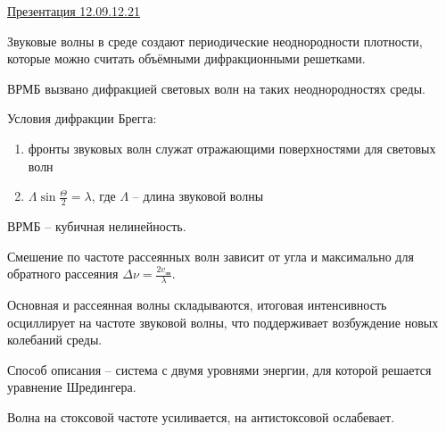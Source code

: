 \documentclass[11 pt]{article}
\begin{document}
    \href{https://docs.google.com/presentation/d/1c5RS2UDGEx-meePbZZv-neXMGNQ4FEft/edit#slide=id.p2}{Презентация 12.09.12.21}

    Звуковые волны в среде создают периодические неоднородности плотности, которые можно считать
    объёмными дифракционными решетками.

    ВРМБ вызвано дифракцией световых волн на таких неоднородностях среды.

    Условия дифракции Брегга:
    \begin{enumerate}
        \item фронты звуковых волн служат отражающими поверхностями для световых волн
        \item $\Lambda \sin \frac{\Theta}{2} = \lambda$, где $\Lambda$ -- длина звуковой волны
    \end{enumerate}

    ВРМБ -- кубичная нелинейность.

    Смешение по частоте рассеянных волн зависит от угла и максимально для обратного рассеяния $\Delta \nu = \frac{2 v_{\text{зв}}}{\lambda}$.

    Основная и рассеянная волны складываются, итоговая интенсивность осциллирует на частоте звуковой волны, что поддерживает возбуждение новых колебаний среды.

    Способ описания -- система с двумя уровнями энергии, для которой решается уравнение Шредингера.

    Волна на стоксовой частоте усиливается, на антистоксовой ослабевает.
\end{document}
